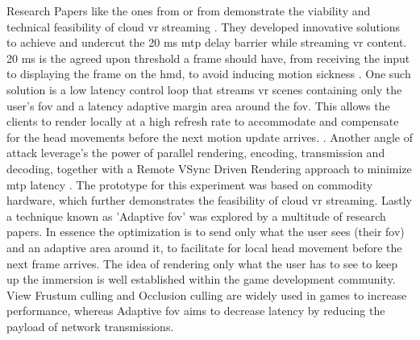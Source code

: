 Research Papers like the ones from \cite{cutcord} or from \cite{mvr} demonstrate the viability and technical feasibility of cloud \acrshort{vr} streaming . They developed innovative solutions to achieve and undercut the 20 \acrfull{ms}  \acrfull{mtp} delay barrier while streaming \acrshort{vr} content. 20 \acrshort{ms} is the agreed upon threshold a frame should have, from receiving the input to displaying the frame on the \acrfull{hmd}, to avoid inducing motion sickness \parencite{valvevrlatency}. One such solution is a low latency control loop that streams \acrshort{vr} scenes containing only the user’s \acrfull{fov} and a latency adaptive margin area around the \acrshort{fov}. This allows the clients to render locally at a high refresh rate to accommodate and compensate for the head movements before the next motion update arrives. \parencite{mvr}. Another angle of attack  leverage's the power of parallel rendering, encoding, transmission and decoding, together with a Remote VSync Driven Rendering approach to minimize \acrshort{mtp} latency \parencite{cutcord}. The prototype for this experiment was based on commodity hardware, which further demonstrates the feasibility of cloud \acrshort{vr} streaming. Lastly a technique known as 'Adaptive \acrfull{fov}' was explored by a multitude of research papers. In essence the optimization is to send only what the user sees (their \acrshort{fov}) and an adaptive area around it, to facilitate for local head movement before the next frame arrives. The idea of rendering only what the user has to see to keep up the immersion is well established within the game development community. View Frustum culling and Occlusion culling \parencite{cullingdefinition} are widely used in games to increase performance, whereas Adaptive \acrshort{fov} aims to decrease latency by reducing the payload of network transmissions.

